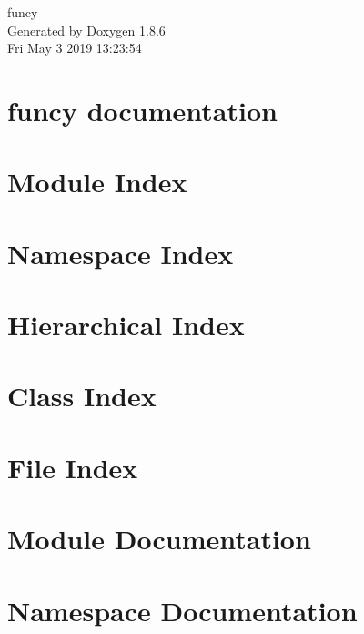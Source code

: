\documentclass[twoside]{book}
\newcommand{\clearemptydoublepage}{%
  \newpage{\pagestyle{empty}\cleardoublepage}%
}
\begin{document}
\hypersetup{pageanchor=false}
\begin{titlepage}
\vspace*{7cm}
\begin{center}%
{\Large funcy }\\
\vspace*{1cm}
{\large Generated by Doxygen 1.8.6}\\
\vspace*{0.5cm}
{\small Fri May 3 2019 13:23:54}\\
\end{center}
\end{titlepage}
\clearemptydoublepage
\tableofcontents
\clearemptydoublepage
{}
\hypersetup{pageanchor=true}

\chapter{funcy documentation}
\label{index}\hypertarget{index}{}
\chapter{Module Index}

\chapter{Namespace Index}

\chapter{Hierarchical Index}

\chapter{Class Index}

\chapter{File Index}

\chapter{Module Documentation}










\chapter{Namespace Documentation}












\end{document}
